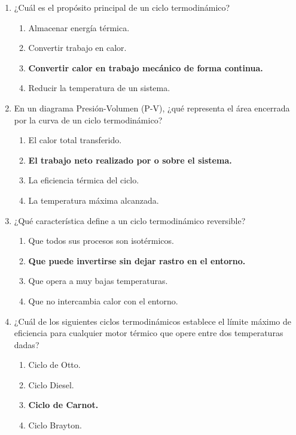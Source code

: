 \documentclass{article}
\begin{document}
\begin{enumerate}[label=\arabic*.]

    \item ¿Cuál es el propósito principal de un ciclo termodinámico?
    \begin{enumerate}[label=\alph*)]
        \item Almacenar energía térmica.
        \item Convertir trabajo en calor.
        \item \textbf{Convertir calor en trabajo mecánico de forma continua.}
        \item Reducir la temperatura de un sistema.
    \end{enumerate}

    \item En un diagrama Presión-Volumen (P-V), ¿qué representa el área encerrada por la curva de un ciclo termodinámico?
    \begin{enumerate}[label=\alph*)]
        \item El calor total transferido.
        \item \textbf{El trabajo neto realizado por o sobre el sistema.}
        \item La eficiencia térmica del ciclo.
        \item La temperatura máxima alcanzada.
    \end{enumerate}

    \item ¿Qué característica define a un ciclo termodinámico reversible?
    \begin{enumerate}[label=\alph*)]
        \item Que todos sus procesos son isotérmicos.
        \item \textbf{Que puede invertirse sin dejar rastro en el entorno.}
        \item Que opera a muy bajas temperaturas.
        \item Que no intercambia calor con el entorno.
    \end{enumerate}

    \item ¿Cuál de los siguientes ciclos termodinámicos establece el límite máximo de eficiencia para cualquier motor térmico que opere entre dos temperaturas dadas?
    \begin{enumerate}[label=\alph*)]
        \item Ciclo de Otto.
        \item Ciclo Diesel.
        \item \textbf{Ciclo de Carnot.}
        \item Ciclo Brayton.
    \end{enumerate}


\end{enumerate}
\end{document}
